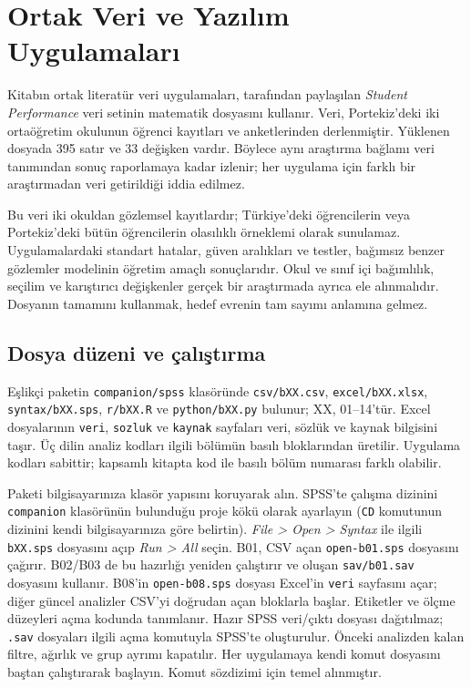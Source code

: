 \chapter*{Ortak Veri ve Yazılım Uygulamaları}
\label{sec:spss-guide}

Kitabın ortak literatür veri uygulamaları, \citet{cortez2008data} tarafından
paylaşılan \emph{Student Performance} veri setinin matematik dosyasını
kullanır. Veri, Portekiz'deki iki ortaöğretim okulunun öğrenci kayıtları ve
anketlerinden derlenmiştir. Yüklenen dosyada 395 satır ve 33 değişken vardır.
Böylece aynı araştırma bağlamı veri tanımından sonuç raporlamaya kadar izlenir;
her uygulama için farklı bir araştırmadan veri getirildiği iddia edilmez.

\begin{researchbox}
Bu veri iki okuldan gözlemsel kayıtlardır; Türkiye'deki öğrencilerin veya
Portekiz'deki bütün öğrencilerin olasılıklı örneklemi olarak sunulamaz.
Uygulamalardaki standart hatalar, güven aralıkları ve testler, bağımsız
benzer gözlemler modelinin öğretim amaçlı sonuçlarıdır. Okul ve sınıf içi
bağımlılık, seçilim ve karıştırıcı değişkenler gerçek bir araştırmada ayrıca
ele alınmalıdır. Dosyanın tamamını kullanmak, hedef evrenin tam sayımı
anlamına gelmez.
\end{researchbox}

\section*{Dosya düzeni ve çalıştırma}

Eşlikçi paketin \texttt{companion/spss} klasöründe
\texttt{csv/bXX.csv}, \texttt{excel/bXX.xlsx}, \texttt{syntax/bXX.sps},
\texttt{r/bXX.R} ve \texttt{python/bXX.py} bulunur; XX, 01--14'tür.
Excel dosyalarının \texttt{veri}, \texttt{sozluk} ve \texttt{kaynak}
sayfaları veri, sözlük ve kaynak bilgisini taşır. Üç dilin analiz kodları
ilgili bölümün basılı bloklarından üretilir. Uygulama kodları sabittir;
kapsamlı kitapta kod ile basılı bölüm numarası farklı olabilir.

Paketi bilgisayarınıza klasör yapısını koruyarak alın.
SPSS'te çalışma dizinini \texttt{companion} klasörünün bulunduğu proje kökü
olarak ayarlayın (\texttt{CD} komutunun dizinini kendi bilgisayarınıza göre
belirtin). \emph{File > Open > Syntax} ile ilgili \texttt{bXX.sps} dosyasını
açıp \emph{Run > All} seçin. B01, CSV açan \texttt{open-b01.sps}
dosyasını çağırır. B02/B03 de bu hazırlığı yeniden çalıştırır ve oluşan
\texttt{sav/b01.sav} dosyasını kullanır. B08'in \texttt{open-b08.sps}
dosyası Excel'in \texttt{veri} sayfasını açar; diğer güncel analizler
CSV'yi doğrudan açan bloklarla başlar. Etiketler ve ölçme düzeyleri
açma kodunda tanımlanır. Hazır SPSS veri/çıktı dosyası dağıtılmaz;
\texttt{.sav} dosyaları ilgili açma komutuyla SPSS'te oluşturulur.
Önceki analizden kalan filtre, ağırlık ve grup ayrımı kapatılır.
Her uygulamaya kendi komut dosyasını baştan çalıştırarak başlayın.
Komut sözdizimi için \citet{ibmspsssyntax} temel alınmıştır.

